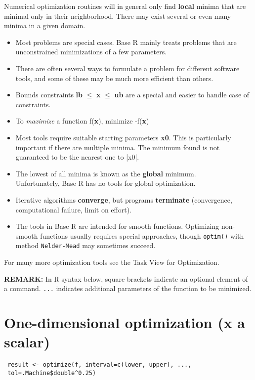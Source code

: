 \documentclass[11pt,a4paper,onecolumn,oneside]{extarticle}
\begin{document}
\begin{landscape}
\begin{multicols}{2}
Numerical optimization routines will in general only find \textbf{local} minima 
that are minimal only in their neighborhood. There may exist several or even 
many minima in a given domain.
\begin{itemize}
\setlength\itemsep{0.1em}
\item
  Most problems are special cases. Base R mainly treats 
  problems that are unconstrained minimizations of a few parameters.
\item
  There are often several ways to formulate a problem for different software  
  tools, and some of these may be much more efficient than others.
\item
  Bounds constraints \textbf{lb} $\le$ \textbf{x} $\le$
  \textbf{ub} are a special and easier to handle case of constraints.
\item
  To \textit{maximize} a function f(\textbf{x}), minimize -f(\textbf{x}) 
\item
  Most tools require suitable starting parameters \textbf{x0}.
  This is particularly important if there are multiple minima.
  The minimum found is not guaranteed to be the nearest one to |x0|.
\item
  The lowest of all minima is known as the \textbf{global} minimum.\\
  Unfortunately, Base R has no tools for global optimization.
\item
  Iterative algorithms \textbf{converge}, but programs
  \textbf{terminate} (convergence, computational failure, limit on
  effort).
\item
  The tools in Base R are intended for smooth functions. 
  Optimizing non-smooth functions usually requires special approaches, though
  \texttt{optim()} with method \texttt{Nelder-Mead} may sometimes succeed.
\end{itemize}

For many more optimization tools see the Task View for Optimization.

\textbf{REMARK:} In R syntax below, square brackets indicate an optional element of a command.
\texttt{...} indicates additional parameters of the function to be minimized.
\columnbreak


\section*{\color{darkred}One-dimensional optimization (x a scalar)}

\texttt{ result <- optimize(f, interval=c(lower, upper), ...,}\\
\hspace*{15mm}\texttt{                    tol=.Machine\$double\^{}0.25)}
\begin{itemize}
\setlength\itemsep{0.1em}


\end{itemize}
\end{multicols}
\end{landscape}
\end{document}
